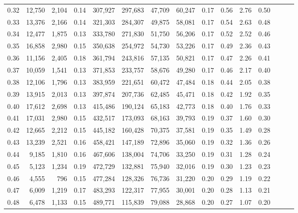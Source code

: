 \begin{tabular}{rrrrrrrrrrrrrrr}
0.32 &  12,750 &  2,104 &  0.14 &  307,927 &  297,683 &   47,709 &   60,247 &  0.17 &  0.56 &  2.76 &      0.50 \\
0.33 &  13,376 &  2,166 &  0.14 &  321,303 &  284,307 &   49,875 &   58,081 &  0.17 &  0.54 &  2.63 &      0.48 \\
0.34 &  12,477 &  1,875 &  0.13 &  333,780 &  271,830 &   51,750 &   56,206 &  0.17 &  0.52 &  2.52 &      0.46 \\
0.35 &  16,858 &  2,980 &  0.15 &  350,638 &  254,972 &   54,730 &   53,226 &  0.17 &  0.49 &  2.36 &      0.43 \\
0.36 &  11,156 &  2,405 &  0.18 &  361,794 &  243,816 &   57,135 &   50,821 &  0.17 &  0.47 &  2.26 &      0.41 \\
0.37 &  10,059 &  1,541 &  0.13 &  371,853 &  233,757 &   58,676 &   49,280 &  0.17 &  0.46 &  2.17 &      0.40 \\
0.38 &  12,106 &  1,796 &  0.13 &  383,959 &  221,651 &   60,472 &   47,484 &  0.18 &  0.44 &  2.05 &      0.38 \\
0.39 &  13,915 &  2,013 &  0.13 &  397,874 &  207,736 &   62,485 &   45,471 &  0.18 &  0.42 &  1.92 &      0.35 \\
0.40 &  17,612 &  2,698 &  0.13 &  415,486 &  190,124 &   65,183 &   42,773 &  0.18 &  0.40 &  1.76 &      0.33 \\
0.41 &  17,031 &  2,980 &  0.15 &  432,517 &  173,093 &   68,163 &   39,793 &  0.19 &  0.37 &  1.60 &      0.30 \\
0.42 &  12,665 &  2,212 &  0.15 &  445,182 &  160,428 &   70,375 &   37,581 &  0.19 &  0.35 &  1.49 &      0.28 \\
0.43 &  13,239 &  2,521 &  0.16 &  458,421 &  147,189 &   72,896 &   35,060 &  0.19 &  0.32 &  1.36 &      0.26 \\
0.44 &   9,185 &  1,810 &  0.16 &  467,606 &  138,004 &   74,706 &   33,250 &  0.19 &  0.31 &  1.28 &      0.24 \\
0.45 &   5,123 &  1,234 &  0.19 &  472,729 &  132,881 &   75,940 &   32,016 &  0.19 &  0.30 &  1.23 &      0.23 \\
0.46 &   4,555 &    796 &  0.15 &  477,284 &  128,326 &   76,736 &   31,220 &  0.20 &  0.29 &  1.19 &      0.22 \\
0.47 &   6,009 &  1,219 &  0.17 &  483,293 &  122,317 &   77,955 &   30,001 &  0.20 &  0.28 &  1.13 &      0.21 \\
0.48 &   6,478 &  1,133 &  0.15 &  489,771 &  115,839 &   79,088 &   28,868 &  0.20 &  0.27 &  1.07 &      0.20 \\

\end{tabular}
